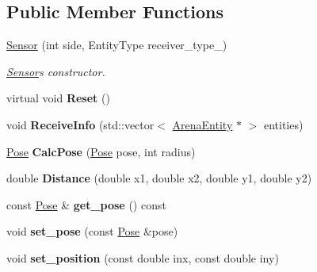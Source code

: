 \subsection*{Public Member Functions}
\begin{DoxyCompactItemize}
\item 
\hyperlink{classSensor_a3db50d290b8bd322fb41fe1244a45c7f}{Sensor} (int side, Entity\+Type receiver\+\_\+type\+\_\+)\hypertarget{classSensor_a3db50d290b8bd322fb41fe1244a45c7f}{}\label{classSensor_a3db50d290b8bd322fb41fe1244a45c7f}

\begin{DoxyCompactList}\small\item\em \hyperlink{classSensor}{Sensor}\textquotesingle{}s constructor. \end{DoxyCompactList}\item 
virtual void {\bfseries Reset} ()\hypertarget{classSensor_a5e6ad1aa7b2c48e59851e03404dacbde}{}\label{classSensor_a5e6ad1aa7b2c48e59851e03404dacbde}

\item 
void {\bfseries Receive\+Info} (std\+::vector$<$ \hyperlink{classArenaEntity}{Arena\+Entity} $\ast$ $>$ entities)\hypertarget{classSensor_a0d2b338b145734a10194d46edbb653ec}{}\label{classSensor_a0d2b338b145734a10194d46edbb653ec}

\item 
\hyperlink{structPose}{Pose} {\bfseries Calc\+Pose} (\hyperlink{structPose}{Pose} pose, int radius)\hypertarget{classSensor_a9d492ed06d6cb53b8a85fefe907095b9}{}\label{classSensor_a9d492ed06d6cb53b8a85fefe907095b9}

\item 
double {\bfseries Distance} (double x1, double x2, double y1, double y2)\hypertarget{classSensor_aa78f80e24756a75b26552c50fa83a53a}{}\label{classSensor_aa78f80e24756a75b26552c50fa83a53a}

\item 
const \hyperlink{structPose}{Pose} \& {\bfseries get\+\_\+pose} () const \hypertarget{classSensor_a342fd9294709f47ebfafaf4cd76b0e19}{}\label{classSensor_a342fd9294709f47ebfafaf4cd76b0e19}

\item 
void {\bfseries set\+\_\+pose} (const \hyperlink{structPose}{Pose} \&pose)\hypertarget{classSensor_a8c0ebd31f6d6203c717e1a77acb0e6bb}{}\label{classSensor_a8c0ebd31f6d6203c717e1a77acb0e6bb}

\item 
void {\bfseries set\+\_\+position} (const double inx, const double iny)\hypertarget{classSensor_aa38343db9a4da55dde95cb2579204b06}{}\label{classSensor_aa38343db9a4da55dde95cb2579204b06}


\end{DoxyCompactItemize}
